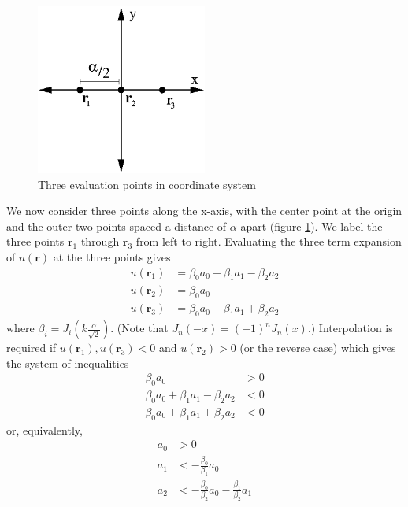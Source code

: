 \documentclass{report}
\newcommand{\rr}[0]{\mathbf{r}}
\begin{document}
\begin{figure}
  \begin{center}
    \includegraphics[width=0.5\textwidth]{figs/interpolation/three_points_on_axes.eps}
    \caption{Three evaluation points in coordinate system}
    \label{fig:three_points}
  \end{center}
\end{figure}

We now consider three points along the x-axis, with the center point at the origin and the outer two points spaced a distance of $\alpha$ apart (figure \ref{fig:three_points}). We label the three points $\rr_{1}$ through $\rr_{3}$ from left to right. Evaluating the three term expansion of $u(\rr)$ at the three points gives
\begin{align*}
  u(\rr_{1}) & = \beta_{0} a_{0} + \beta_{1} a_{1} - \beta_{2} a_{2} \\
  u(\rr_{2}) & = \beta_{0} a_{0} \\
  u(\rr_{3}) & = \beta_{0} a_{0} + \beta_{1} a_{1} + \beta_{2} a_{2}
\end{align*}
where $\beta_{i} = J_{i} \left( k \frac{\alpha}{\sqrt{2}} \right)$. (Note that $J_{n}(-x) = (-1)^{n} J_{n}(x)$.) Interpolation is required if $u(\rr_{1}), u(\rr_{3}) < 0$ and $u(\rr_{2}) > 0$ (or the reverse case) which gives the system of inequalities
\begin{align*}
  \beta_{0} a_{0} & > 0 \\
  \beta_{0} a_{0} + \beta_{1} a_{1} - \beta_{2} a_{2} & < 0 \\
  \beta_{0} a_{0} + \beta_{1} a_{1} + \beta_{2} a_{2} & < 0
\end{align*}
or, equivalently,
\begin{align*}
  a_{0} & > 0 \\
  a_{1} & < -\frac{\beta_{0}}{\beta_{1}} a_{0} \\
  a_{2} & < -\frac{\beta_{0}}{\beta_{2}} a_{0} - \frac{\beta_{1}}{\beta_{2}} a_{1}
\end{align*}
\end{document}
